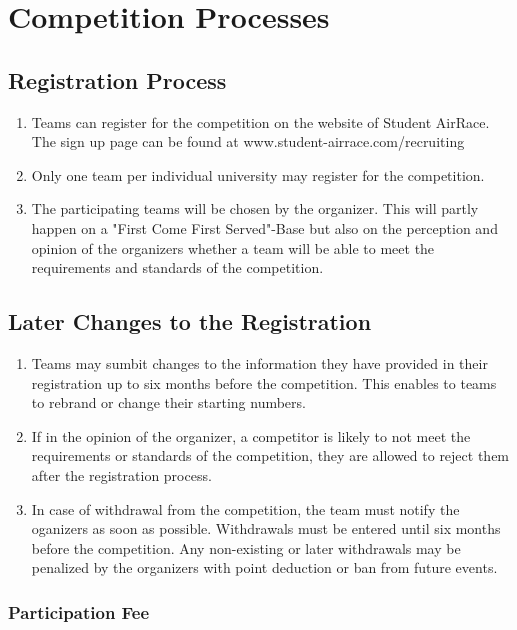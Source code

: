     \section{Competition Processes}

    \subsection{Registration Process}
    \begin{enumerate}
      \item Teams can register for the competition on the website of Student AirRace. The sign up page can be found at www.student-airrace.com/recruiting 
      \item Only one team per individual university may register for the competition.  
      \item The participating teams will be chosen by the organizer. This will partly happen on a "First Come First Served"-Base but also
      on the perception and opinion of the organizers whether a team will be able to meet the requirements and standards of the competition. 
    \end{enumerate}

    \subsection{Later Changes to the Registration}
    \begin{enumerate}
      \item Teams may sumbit changes to the information they have provided in their registration up to six months before the competition. This enables to teams to rebrand or change their starting numbers.
      \item If in the opinion of the organizer, a competitor is likely to not meet the requirements or standards
      of the competition, they are allowed to reject them after the registration process. 
      \item In case of withdrawal from the competition, the team must notify the oganizers as soon as possible. Withdrawals must be entered until six months before the competition. 
      Any non-existing or later withdrawals may be penalized by the organizers with point deduction or ban from future events. 
    \end{enumerate}

    \subsubsection{Participation Fee}

